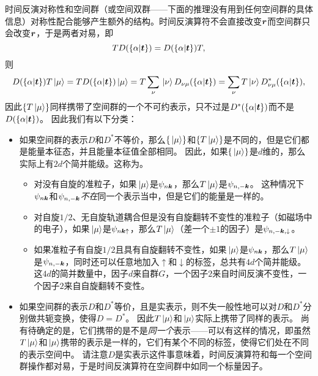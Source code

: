 时间反演对称性和空间群（或空间双群——下面的推理没有用到任何空间群的具体信息）对称性配合能够产生额外的结构。时间反演算符不会直接改变$\vb*{r}$而空间群只会改变$\vb*{r}$，于是两者对易，即
\[
    T D(\{ \alpha | \vb*{t} \}) = D(\{ \alpha | \vb*{t}\}) T,
\]
则
\begin{equation}
    D(\{ \alpha | \vb*{t}\}) T \ket*{\mu} = T D(\{ \alpha | \vb*{t} \}) \ket*{\mu} = T \sum_\nu \ket*{\nu} D_{\nu \mu}(\{ \alpha | \vb*{t} \}) = \sum_\nu T \ket*{\nu} D^*_{\nu \mu}(\{ \alpha | \vb*{t} \}) ,
    \label{eq:group-cc-time-reversal}
\end{equation}
因此$\{T \ket*{\mu}\}$同样携带了空间群的一个不可约表示，只不过是$D^*(\{ \alpha | \vb*{t} \})$而不是$D(\{ \alpha | \vb*{t} \})$。
因此我们有以下分类：
\begin{itemize}
    \item 如果空间群的表示$D$和$D^*$不等价，那么$\{\ket*{\mu}\}$和$\{T \ket*{\mu}\}$是不同的，但是它们都是能量本征态，并且能量本征值全部相同。
    因此，如果$\{\ket*{\mu}\}$是$d$维的，那么实际上有$2d$个简并能级。这称为。
    \begin{itemize}
        \item 对没有自旋的准粒子，如果$\ket*{\mu}$是$\psi_{n \vb*{k}}$，那么$T \ket*{\mu}$是$\psi_{n, -\vb*{k}}$。
        这种情况下$\psi_{n \vb*{k}}$和$\psi_{n, - \vb*{k}}$\emph{不在}同一个表示当中，但是它们的能量是一样的。
        \item 对自旋$1/2$、无自旋轨道耦合但是没有自旋翻转不变性的准粒子（如磁场中的电子），如果$\ket*{\mu}$是$\psi_{n \vb*{k} \uparrow}$，那么$T \ket*{\mu}$（差一个$\pm 1$的因子）是$\psi_{n, -\vb*{k}, \downarrow}$。
        \item 如果准粒子有自旋$1/2$且具有自旋翻转不变性，如果$\ket*{\mu}$是$\psi_{n \vb*{k}}$，那么$T \ket*{\mu}$是$\psi_{n, -\vb*{k}}$，同时还可以任意地加入$\uparrow$和$\downarrow$的标签，总共有$4d$个简并能级。
        这$4d$的简并数量中，因子$d$来自群$G$，一个因子$2$来自时间反演不变性，一个因子$2$来自自旋翻转不变性。
    \end{itemize}
    \item 如果空间群的表示$D$和$D^*$等价，且是实表示，则不失一般性地可以对$D$和$D^*$分别做共轭变换，使得$D = D^*$。
    因此$T \ket*{\mu}$和$\ket*{\mu}$实际上携带了同样的表示。
    尚有待确定的是，它们携带的是不是\emph{同一个}表示——可以有这样的情况，即虽然$T \ket*{\mu}$和$\ket*{\mu}$携带的表示是一样的，它们有某个不同的标签，使得它们处在不同的表示空间中。
    请注意$D$是实表示这件事意味着，时间反演算符和每一个空间群操作都对易，于是时间反演算符在空间群中如同一个标量因子。

\end{itemize}
